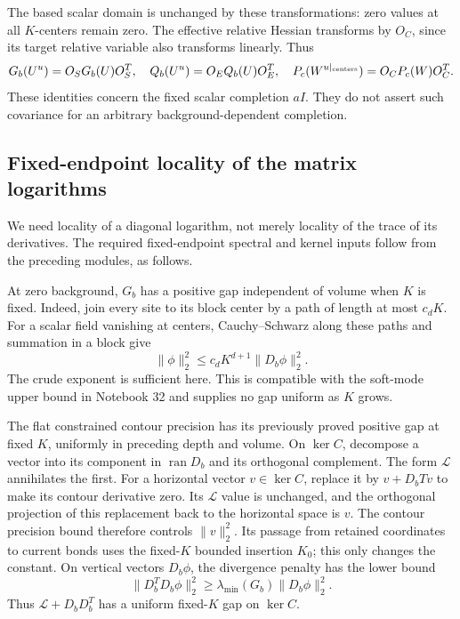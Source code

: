 \documentclass[11pt]{article}
\theoremstyle{remark}
\begin{document}
The based scalar domain is unchanged by these transformations:
zero values at all \(K\)-centers remain zero. The effective
relative Hessian transforms by \(O_C\), since its target
relative variable also transforms linearly. Thus
\begin{equation}
 G_b(U^u)=O_SG_b(U)O_S^T,\quad
 Q_b(U^u)=O_EQ_b(U)O_E^T,\quad
 P_c(W^{u|_{\rm centers}})=O_CP_c(W)O_C^T.
 \label{gdd-matrix-covariance}
\end{equation}
These identities concern the fixed scalar completion \(aI\).
They do not assert such covariance for an arbitrary
background-dependent completion.

\subsection{Fixed-endpoint locality of the matrix logarithms}
\label{gdd-log-locality-section}

We need locality of a diagonal logarithm, not merely locality
of the trace of its derivatives. The required fixed-endpoint
spectral and kernel inputs follow from the preceding modules,
as follows.

At zero background, \(G_b\) has a positive gap independent
of volume when \(K\) is fixed. Indeed, join every site to
its block center by a path of length at most \(c_dK\).
For a scalar field vanishing at centers, Cauchy--Schwarz
along these paths and summation in a block give
\begin{equation}
 \|\phi\|_2^2\le c_d K^{d+1}\|D_b\phi\|_2^2.
 \label{gdd-pinned-Poincare}
\end{equation}
The crude exponent is sufficient here. This is compatible
with the soft-mode upper bound in Notebook 32 and supplies
no gap uniform as \(K\) grows.

The flat constrained contour precision has its previously
proved positive gap at fixed \(K\), uniformly in preceding
depth and volume. On \(\ker C\), decompose a vector into
its component in \(\operatorname{ran}D_b\) and its orthogonal
complement. The form \(\mathcal L\) annihilates the first.
For a horizontal vector \(v\in\ker C\), replace it by
\(v+D_bTv\) to make its contour derivative zero.
Its \(\mathcal L\) value is unchanged, and the orthogonal
projection of this replacement back to the horizontal
space is \(v\). The contour precision bound therefore
controls \(\|v\|_2^2\). Its passage from retained
coordinates to current bonds uses the fixed-\(K\)
bounded insertion \(K_0\); this only changes the constant.
On vertical vectors \(D_b\phi\), the divergence penalty
has the lower bound
\[
 \|D_b^TD_b\phi\|_2^2
       \ge \lambda_{\min}(G_b)\|D_b\phi\|_2^2.
\]
Thus \(\mathcal L+D_bD_b^T\) has a uniform fixed-\(K\)
gap on \(\ker C\).
\end{document}
